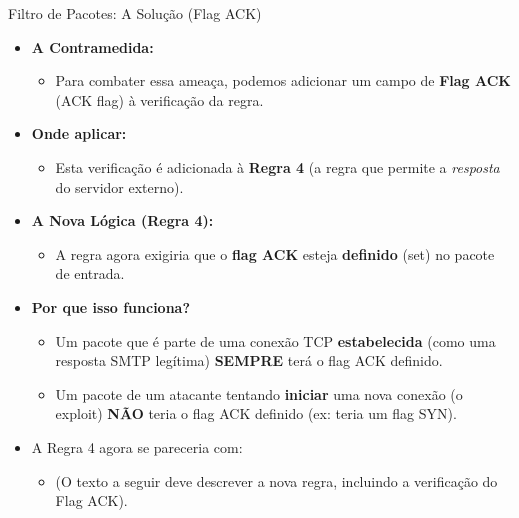 \begin{frame}{Filtro de Pacotes: A Solução (Flag ACK)}
    \begin{itemize}
        \item \textbf{A Contramedida:}
              \begin{itemize}
                  \item Para combater essa ameaça, podemos adicionar um campo de \textbf{Flag ACK} (ACK flag) à verificação da regra.
              \end{itemize}

        \item \textbf{Onde aplicar:}
              \begin{itemize}
                  \item Esta verificação é adicionada à \textbf{Regra 4} (a regra que permite a \textit{resposta} do servidor externo).
              \end{itemize}

        \item \textbf{A Nova Lógica (Regra 4):}
              \begin{itemize}
                  \item A regra agora exigiria que o \textbf{flag ACK} esteja \textbf{definido} (set) no pacote de entrada.
              \end{itemize}

        \item \textbf{Por que isso funciona?}
              \begin{itemize}
                  \item Um pacote que é parte de uma conexão TCP \textbf{estabelecida} (como uma resposta SMTP legítima) \textbf{SEMPRE} terá o flag ACK definido.
                  \item Um pacote de um atacante tentando \textbf{iniciar} uma nova conexão (o exploit) \textbf{NÃO} teria o flag ACK definido (ex: teria um flag SYN).
              \end{itemize}

        \item A Regra 4 agora se pareceria com:
              \begin{itemize}
                  \item (O texto a seguir deve descrever a nova regra, incluindo a verificação do Flag ACK).
              \end{itemize}
    \end{itemize}
\end{frame}

